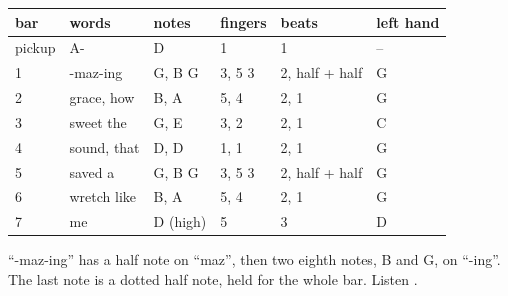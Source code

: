 \begin{center}
\begin{tabular}{llllll}
\toprule
bar & words & notes & fingers & beats & left hand \\
\midrule
pickup & A- & D & 1 & 1 & -- \\
1 & -maz-ing & G, B G & 3, 5 3 & 2, half + half & G \\
2 & grace, how & B, A & 5, 4 & 2, 1 & G \\
3 & sweet the & G, E & 3, 2 & 2, 1 & C \\
4 & sound, that & D, D & 1, 1 & 2, 1 & G \\
5 & saved a & G, B G & 3, 5 3 & 2, half + half & G \\
6 & wretch like & B, A & 5, 4 & 2, 1 & G \\
7 & me & D (high) & 5 & 3 & D \\
\bottomrule
\end{tabular}
\end{center}

``-maz-ing'' has a half note on ``maz'', then two eighth notes, B and G, on ``-ing''. The last note is a dotted half note, held for the whole bar. Listen .

